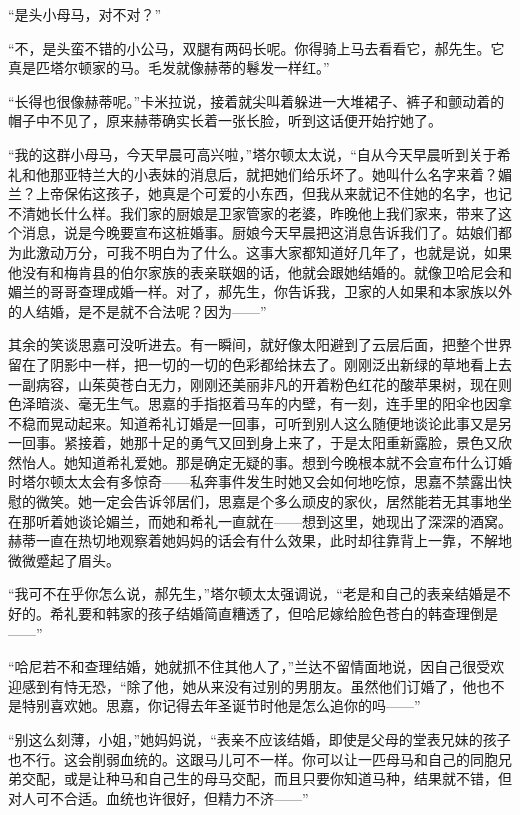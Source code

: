 \par “是头小母马，对不对？”
\par “不，是头蛮不错的小公马，双腿有两码长呢。你得骑上马去看看它，郝先生。它真是匹塔尔顿家的马。毛发就像赫蒂的鬈发一样红。”
\par “长得也很像赫蒂呢。”卡米拉说，接着就尖叫着躲进一大堆裙子、裤子和颤动着的帽子中不见了，原来赫蒂确实长着一张长脸，听到这话便开始拧她了。
\par “我的这群小母马，今天早晨可高兴啦，”塔尔顿太太说，“自从今天早晨听到关于希礼和他那亚特兰大的小表妹的消息后，就把她们给乐坏了。她叫什么名字来着？媚兰？上帝保佑这孩子，她真是个可爱的小东西，但我从来就记不住她的名字，也记不清她长什么样。我们家的厨娘是卫家管家的老婆，昨晚他上我们家来，带来了这个消息，说是今晚要宣布这桩婚事。厨娘今天早晨把这消息告诉我们了。姑娘们都为此激动万分，可我不明白为了什么。这事大家都知道好几年了，也就是说，如果他没有和梅肯县的伯尔家族的表亲联姻的话，他就会跟她结婚的。就像卫哈尼会和媚兰的哥哥查理成婚一样。对了，郝先生，你告诉我，卫家的人如果和本家族以外的人结婚，是不是就不合法呢？因为——”
\par 其余的笑谈思嘉可没听进去。有一瞬间，就好像太阳避到了云层后面，把整个世界留在了阴影中一样，把一切的一切的色彩都给抹去了。刚刚泛出新绿的草地看上去一副病容，山茱萸苍白无力，刚刚还美丽非凡的开着粉色红花的酸苹果树，现在则色泽暗淡、毫无生气。思嘉的手指抠着马车的内壁，有一刻，连手里的阳伞也因拿不稳而晃动起来。知道希礼订婚是一回事，可听到别人这么随便地谈论此事又是另一回事。紧接着，她那十足的勇气又回到身上来了，于是太阳重新露脸，景色又欣然怡人。她知道希礼爱她。那是确定无疑的事。想到今晚根本就不会宣布什么订婚时塔尔顿太太会有多惊奇——私奔事件发生时她又会如何地吃惊，思嘉不禁露出快慰的微笑。她一定会告诉邻居们，思嘉是个多么顽皮的家伙，居然能若无其事地坐在那听着她谈论媚兰，而她和希礼一直就在——想到这里，她现出了深深的酒窝。赫蒂一直在热切地观察着她妈妈的话会有什么效果，此时却往靠背上一靠，不解地微微蹙起了眉头。
\par “我可不在乎你怎么说，郝先生，”塔尔顿太太强调说，“老是和自己的表亲结婚是不好的。希礼要和韩家的孩子结婚简直糟透了，但哈尼嫁给脸色苍白的韩查理倒是——”
\par “哈尼若不和查理结婚，她就抓不住其他人了，”兰达不留情面地说，因自己很受欢迎感到有恃无恐，“除了他，她从来没有过别的男朋友。虽然他们订婚了，他也不是特别喜欢她。思嘉，你记得去年圣诞节时他是怎么追你的吗——”
\par “别这么刻薄，小姐，”她妈妈说，“表亲不应该结婚，即使是父母的堂表兄妹的孩子也不行。这会削弱血统的。这跟马儿可不一样。你可以让一匹母马和自己的同胞兄弟交配，或是让种马和自己生的母马交配，而且只要你知道马种，结果就不错，但对人可不合适。血统也许很好，但精力不济——”
